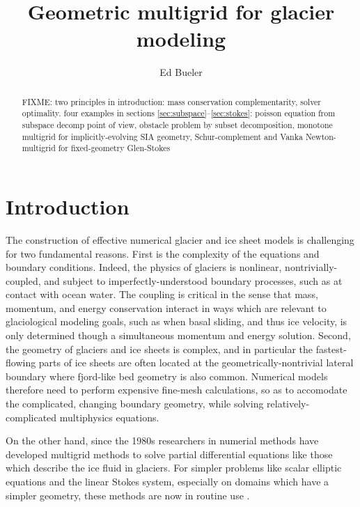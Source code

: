 \documentclass[letterpaper,final,12pt,reqno]{amsart}
\begin{document}
\title{Geometric multigrid for glacier modeling}

\author{Ed Bueler}

\begin{abstract} FIXME: two principles in introduction: mass conservation complementarity, solver optimality.  four examples in sections \ref{sec:subspace}--\ref{sec:stokes}: poisson equation from subspace decomp point of view, obstacle problem by subset decomposition, monotone multigrid for implicitly-evolving SIA geometry, Schur-complement and Vanka Newton-multigrid for fixed-geometry Glen-Stokes
\end{abstract}

\maketitle

\tableofcontents

\thispagestyle{empty}
\bigskip

\section{Introduction} \label{sec:intro}

The construction of effective numerical glacier and ice sheet models is challenging for two fundamental reasons.  First is the complexity of the equations and boundary conditions.  Indeed, the physics of glaciers is nonlinear, nontrivially-coupled, and subject to imperfectly-understood boundary processes, such as at contact with ocean water.  The coupling is critical in the sense that mass, momentum, and energy conservation interact in ways which are relevant to glaciological modeling goals, such as when basal sliding, and thus ice velocity, is only determined though a simultaneous momentum and energy solution.  Second, the geometry of glaciers and ice sheets is complex, and in particular the fastest-flowing parts of ice sheets are often located at the geometrically-nontrivial lateral boundary where fjord-like bed geometry is also common.  Numerical models therefore need to perform expensive fine-mesh calculations, so as to accomodate the complicated, changing boundary geometry, while solving relatively-complicated multiphysics equations.

On the other hand, since the 1980s researchers in numerial methods have developed multigrid methods to solve partial differential equations like those which describe the ice fluid in glaciers.   For simpler problems like scalar elliptic equations and the linear Stokes system, especially on domains which have a simpler geometry, these methods are now in routine use \cite{Briggsetal2000,Bueler2021,Trottenbergetal2001}.
\end{document}
